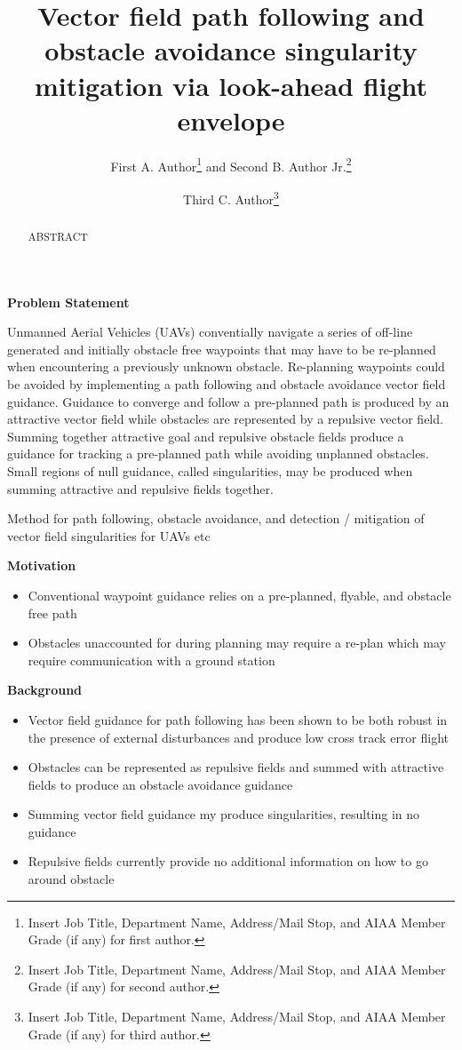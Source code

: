 \documentclass[conf]{new-aiaa}
\title{Vector field  path following and obstacle avoidance singularity mitigation via look-ahead flight envelope}
\author{First A. Author\footnote{Insert Job Title, Department Name, Address/Mail Stop, and AIAA Member Grade (if any) for first author.} and Second B. Author Jr.\footnote{Insert Job Title, Department Name, Address/Mail Stop, and AIAA Member Grade (if any) for second author.}}
\affil{Business or Academic Affiliation 1, City, State, Zip Code}
\author{Third C. Author\footnote{Insert Job Title, Department Name, Address/Mail Stop, and AIAA Member Grade (if any) for third author.}}
\begin{document}
\maketitle

\begin{abstract}
ABSTRACT
\end{abstract}

\textbf{Problem Statement} 

Unmanned Aerial Vehicles (UAVs) conventially navigate a series of off-line generated and initially obstacle free waypoints that may have to be re-planned when encountering a previously unknown obstacle. Re-planning waypoints could be avoided by implementing a path following and obstacle avoidance vector field guidance. Guidance to converge and follow a pre-planned path is produced by an attractive vector field while obstacles are represented by a repulsive vector field. Summing together attractive goal and repulsive obstacle fields produce a guidance for tracking a pre-planned path while avoiding unplanned obstacles. Small regions of null guidance, called singularities, may be produced when summing attractive and repulsive fields together. 

Method for path following, obstacle avoidance, and detection / mitigation of vector field singularities for UAVs etc



 

\textbf{Motivation}
\begin{itemize}
	\item Conventional waypoint guidance relies on a pre-planned, flyable, and obstacle free path 
	\item Obstacles unaccounted for during planning may require a re-plan which may require communication with a ground station
\end{itemize}


\textbf{Background}
\begin{itemize}
	\item Vector field guidance for path following has been shown to be both robust in the presence of external disturbances and produce low cross track error flight
	\item Obstacles can be represented as repulsive fields and summed with attractive fields to produce an obstacle avoidance guidance
	\item  Summing vector field guidance my produce singularities, resulting in no guidance
	\item Repulsive fields currently provide no additional information on how to go around obstacle
\end{itemize}
\end{document}
